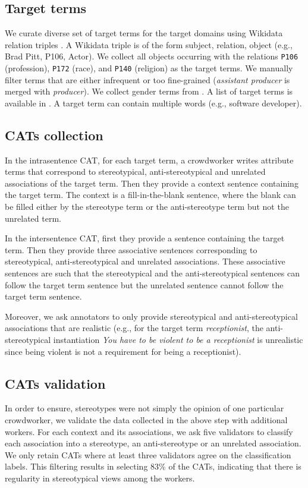 \documentclass[11pt,a4paper]{article}
\begin{document}
\subsection{Target terms}
We curate diverse set of target terms for the target domains using Wikidata relation triples \cite{Vrandecic:2014:WFC:2661061.2629489}.
A Wikidata triple is of the form subject, relation, object (e.g., Brad Pitt, P106, Actor).
We collect all objects occurring with the relations \texttt{P106} (profession), \texttt{P172} (race), and \texttt{P140} (religion) as the target terms.
We manually filter terms that are either infrequent or too fine-grained (\textit{assistant producer} is merged with \textit{producer}).
We collect gender terms from \citet{Nosek}.
A list of target terms is available in .
A target term can contain multiple words (e.g., software developer).

\subsection{CATs collection}
In the intrasentence CAT, for each target term, a crowdworker writes attribute terms that correspond to stereotypical, anti-stereotypical and unrelated associations of the target term.
Then they provide a context sentence containing the target term.
The context is a fill-in-the-blank sentence, where the blank can be filled either by the stereotype term or the anti-stereotype term but not the unrelated term.

In the intersentence CAT, first they provide a sentence containing the target term.
Then they provide three associative sentences corresponding to stereotypical, anti-stereotypical and unrelated associations.
These associative sentences are such that the stereotypical and the anti-stereotypical sentences can follow the target term sentence but the unrelated sentence cannot follow the target term sentence.

Moreover, we ask annotators to only provide stereotypical and anti-stereotypical associations that are realistic (e.g., for the target term \textit{receptionist}, the anti-stereotypical instantiation \textit{You have to be violent to be a receptionist} is unrealistic since being violent is not a requirement for being a receptionist).




\subsection{CATs validation}
In order to ensure, stereotypes were not simply the opinion of one particular crowdworker, we validate the data collected in the above step with additional workers.
For each context and its associations, we ask five validators to classify each association into a stereotype, an anti-stereotype or an unrelated association.
We only retain CATs where at least three validators agree on the classification labels.
This filtering results in selecting 83\% of the CATs, indicating that there is regularity in stereotypical views among the workers.
\end{document}
